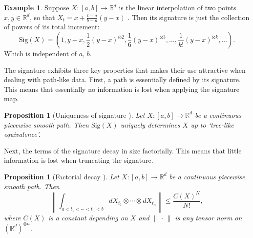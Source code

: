 \documentclass{article}
\theoremstyle{plain}
\newtheorem{proposition}[thm]{Proposition}
\theoremstyle{definition}
\newtheorem{example}[thm]{Example}
\begin{document}
\begin{example} \label{ex:sigincrement}
	Suppose $X \colon [a, b] \to \mathbb R^d$ is the linear interpolation of two points $ x,y \in \mathbb R^d $, so that $ X_t = x + \frac{t-a}{b-a}(y-x) $ . Then its signature is just the collection of powers of its total increment:
	\begin{equation*}
	\mathrm{Sig}(X) = \left(1, y-x, \frac{1}{2} (y-x)^{\otimes 2}, \frac{1}{6} (y-x)^{\otimes 3}, \ldots, \frac{1}{k!} (y-x)^{\otimes k}, \ldots \right).
	\end{equation*}
	Which is independent of $a$, $b$.
\end{example}



The signature exhibits three key properties that makes their use attractive when dealing with path-like data. First, a path is essentially defined by its signature. This means that essentially no information is lost when applying the signature map.%
\begin{proposition}[Uniqueness of signature \cite{hambly2010uniqueness}]\label{prop:uniqueness}
	Let $X \colon [a, b] \to \mathbb R^d$ be a continuous piecewise smooth path. Then $\mathrm{Sig}(X)$ uniquely determines $X$ up to `tree-like equivalence'.
\end{proposition}

Next, the terms of the signature decay in size factorially. This means that little information is lost when truncating the signature.
\begin{proposition}[{Factorial decay \cite[Lemma 2.1.1]{lyons1998differential}}]
	Let $X \colon [a,b]\to \mathbb R^d$ be a continuous piecewise smooth path. Then
	\begin{equation*}
	\left \lVert \int_{a < t_1 < \cdots < t_n < b} dX_{t_1} \otimes \cdots \otimes  dX_{t_n} \right \rVert \leq \dfrac{C(X)^N}{N!},
	\end{equation*} 
	where $C(X)$ is a constant depending on $X$ and $ \lVert \,\cdot\, \rVert $ is any tensor norm on $ (\mathbb R^d)^{\otimes n} $.
\end{proposition}
\end{document}
